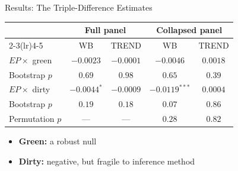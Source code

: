 \documentclass{beamer}
\begin{document}
\begin{frame}{Results: The Triple-Difference Estimates}

  \begin{center}
  \small
  \setlength{\tabcolsep}{5pt}
  \begin{tabular}{lcccc}
    \toprule
     & \multicolumn{2}{c}{Full panel} & \multicolumn{2}{c}{Collapsed panel} \\
    \cmidrule(lr){2-3}\cmidrule(lr){4-5}
     & WB & TREND & WB & TREND \\
    \midrule
    $EP\times$ green & $-0.0023$ & $-0.0001$ & $-0.0046$ & $0.0018$ \\
    Bootstrap $p$     & $0.69$ & $0.98$ & $0.65$ & $0.39$ \\[6pt]
    $EP\times$ dirty  & $-0.0044^{*}$ & $-0.0009$ & $-0.0119^{***}$ & $0.0004$ \\
    Bootstrap $p$     & $0.19$ & $0.18$ & $0.07$ & $0.86$ \\
    Permutation $p$   & --- & --- & $0.28$ & $0.82$ \\
    \bottomrule
  \end{tabular}
  \end{center}

  \vspace{1.5em}
  \begin{itemize}\setlength\itemsep{8pt}
    \item \textbf{Green:} a robust null
    \item \textbf{Dirty:} negative, but fragile to inference method
  \end{itemize}

\end{frame}
\end{document}
